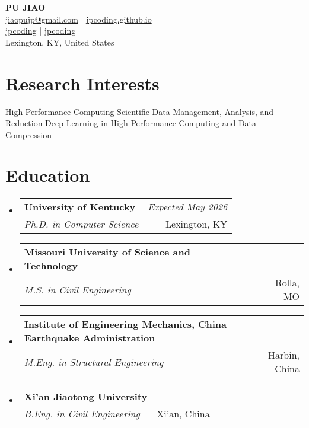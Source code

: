 \documentclass[a4paper,11pt]{article}
\makeatletter
\newcommand{\resumeSubheading}[4]{
\vspace{0.5mm}\item
    \begin{tabular*}{0.98\textwidth}[t]{l@{\extracolsep{\fill}}r}
        \textbf{#1} & \textit{\footnotesize{#4}} \\
        \textit{\footnotesize{#3}} &  \footnotesize{#2}\\
    \end{tabular*}
    \vspace{-2.4mm}
}
\newcommand{\resumeSubHeadingListStart}{\begin{itemize}[leftmargin=*,labelsep=1mm]}
\newcommand{\resumeSubHeadingListEnd}{\end{itemize}\vspace{2mm}}
\newcommand{\socialicon}[1]{\raisebox{-0.05em}{\resizebox{!}{1em}{#1}}}
\newcommand{\headerfontiii}{\fontfamily{ppl}\selectfont} %
\makeatother
\begin{document}
\headerfontiii

\begin{center}
    {\Huge\textbf{PU JIAO}}\\[0.5em]
    \small{
    \href{mailto:jiaopujp@gmail.com}{jiaopujp@gmail.com} | 
    \href{https://jpcoding.github.io/}{jpcoding.github.io}
    }\\[0.3em]
    \small{
    \socialicon{\faLinkedin} \href{https://www.linkedin.com/in/jpcoding}{jpcoding} | 
    \socialicon{\faGithub} \href{https://github.com/jpcoding}{jpcoding}
    }\\[0.2em]
    \small{Lexington, KY, United States}
\end{center}

\vspace{-4mm}


\section{\textbf{Research Interests}}
\vspace{-0.4mm}
\small{
High-Performance Computing 
Scientific Data Management, Analysis, and Reduction 
Deep Learning in High-Performance Computing and Data Compression
}
\vspace{-2mm}

\section{\textbf{Education}}
\vspace{-0.4mm}
\resumeSubHeadingListStart

\resumeSubheading
{University of Kentucky}{Lexington, KY}
{Ph.D. in Computer Science}{Expected May 2026}

\resumeSubheading
{Missouri University of Science and Technology}{Rolla, MO}
{M.S. in Civil Engineering}{}

\resumeSubheading
{Institute of Engineering Mechanics, China Earthquake Administration}{Harbin, China}
{M.Eng. in Structural Engineering}{}

\resumeSubheading
{Xi'an Jiaotong University}{Xi'an, China}
{B.Eng. in Civil Engineering}{}

\resumeSubHeadingListEnd
\vspace{-6mm}
\end{document}
